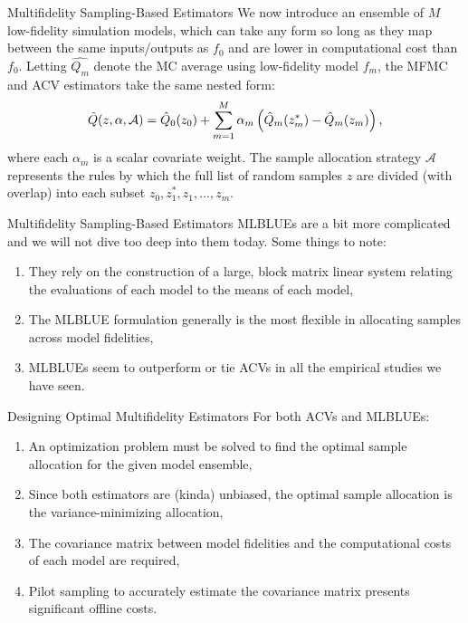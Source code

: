\documentclass[usenames,dvipsnames]{beamer}
\theoremstyle{definition}
\begin{document}
\begin{frame}{Multifidelity Sampling-Based Estimators}
    We now introduce an ensemble of $M$ low-fidelity simulation models, which can take any form so long as they map between the same inputs/outputs as $f_{0}$ and are lower in computational cost than $f_{0}$. Letting $\hat{Q_{m}}$ denote the MC average using low-fidelity model $f_{m}$, the MFMC and ACV estimators take the same nested form:
    \begin{equation}\label{eqn:ACV-Formula}
        \Tilde{Q}(z,\alpha,\mathcal{A}) = \hat{Q}_{0}(z_{0})+\sum^{M}_{m=1}\alpha_{m}\left( \hat{Q}_{m}(z^{*}_{m})-\hat{Q}_{m}(z_{m}) \right),
    \end{equation}
    where each $\alpha_{m}$ is a scalar covariate weight. The sample allocation strategy $\mathcal{A}$ represents the rules by which the full list of random samples $z$ are divided (with overlap) into each subset $z_{0},z_{1}^{*},z_{1},...,z_{m}$.
\end{frame}

\begin{frame}{Multifidelity Sampling-Based Estimators}
    MLBLUEs are a bit more complicated and we will not dive too deep into them today. Some things to note:
    \begin{enumerate}
        \item They rely on the construction of a large, block matrix linear system relating the evaluations of each model to the means of each model,
        \item The MLBLUE formulation generally is the most flexible in allocating samples across model fidelities,
        \item MLBLUEs seem to outperform or tie ACVs in all the empirical studies we have seen.
    \end{enumerate}
\end{frame}

\begin{frame}{Designing Optimal Multifidelity Estimators}
    For both ACVs and MLBLUEs:
    \begin{enumerate}
        \item An optimization problem must be solved to find the optimal sample allocation for the given model ensemble,
        \item Since both estimators are (kinda) unbiased, the optimal sample allocation is the variance-minimizing allocation,
        \item The covariance matrix between model fidelities and the computational costs of each model are required,
        \item Pilot sampling to accurately estimate the covariance matrix presents significant offline costs.
    \end{enumerate}
\end{frame}
\end{document}
